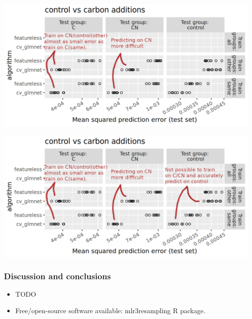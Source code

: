 \documentclass{beamer}
\begin{document}
\begin{frame}
  \includegraphics[width=\textwidth]{qsip_pc2_all_new-control.vs.carbon.additions.other.2.png}
\end{frame}

\begin{frame}
  \includegraphics[width=\textwidth]{qsip_pc2_all_new-control.vs.carbon.additions.other.3.png}
\end{frame}



\begin{frame}
  \frametitle{Discussion and conclusions}
  \begin{itemize}
  \item TODO
  \item Free/open-source software available: mlr3resampling R package.
  \end{itemize}
\end{frame}
\end{document}
